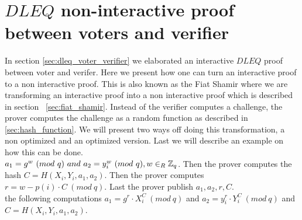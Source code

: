 \section{$DLEQ$ non-interactive proof between voters and verifier}
\label{sec:dleq_non-interactive-proof-between_voters_and_verifier}
In section \ref{sec:dleq_voter_verifier} we elaborated an interactive $DLEQ$ proof between voter and verifer. Here we present how one can turn an interactive proof to a non interactive proof. This is also known as the Fiat Shamir where we are transforming an interactive proof into a non interactive proof which is described in section ~\ref{sec:fiat_shamir}. Instead of the verifier computes a challenge, the prover computes the challenge as a random function as described in \ref{sec:hash_function}.  We will present two ways off doing this transformation, a non optimized and an optimized version. Last we will describe an example on how this can be done.\\


 \begin{math}a_1=g^w \ (mod\ q)  \ and \ a_2=y_i^w \ (mod\ q),  w\in_R \Z_q \end{math}. Then the prover computes the hash \begin{math}C=H(X_i,Y_i,a_1,a_2) \end{math}. Then the prover computes  \begin{math}r=w-p(i)  \cdot  C \ (mod\ q)\end{math}. Last the prover publish \begin{math}a_1, a_2,r,C\end{math}. \\

\noindent
{} the following computations \begin{math}a_1 = g^r \cdot X_i^C  \ (mod\ q)\end{math} and \begin{math} a_2=y_i^r  \cdot  Y_i^C \ (mod\ q)\end{math} and \begin{math}C=H(X_i,Y_i,a_1,a_2)\end{math}.


